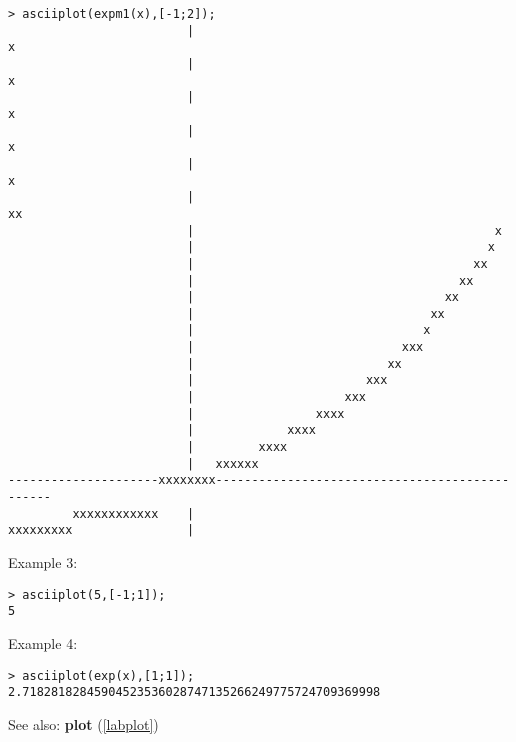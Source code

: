 \begin{center}\begin{minipage}{15cm}\begin{Verbatim}[frame=single]
> asciiplot(expm1(x),[-1;2]);
                         |                                                 x
                         |                                                x 
                         |                                               x  
                         |                                              x   
                         |                                             x    
                         |                                           xx     
                         |                                          x       
                         |                                         x        
                         |                                       xx         
                         |                                     xx           
                         |                                   xx             
                         |                                 xx               
                         |                                x                 
                         |                             xxx                  
                         |                           xx                     
                         |                        xxx                       
                         |                     xxx                          
                         |                 xxxx                             
                         |             xxxx                                 
                         |         xxxx                                     
                         |   xxxxxx                                         
---------------------xxxxxxxx-----------------------------------------------
         xxxxxxxxxxxx    |                                                  
xxxxxxxxx                |                                                  
\end{Verbatim}
\end{minipage}\end{center}
\noindent Example 3: 
\begin{center}\begin{minipage}{15cm}\begin{Verbatim}[frame=single]
> asciiplot(5,[-1;1]);
5
\end{Verbatim}
\end{minipage}\end{center}
\noindent Example 4: 
\begin{center}\begin{minipage}{15cm}\begin{Verbatim}[frame=single]
> asciiplot(exp(x),[1;1]);
2.71828182845904523536028747135266249775724709369998
\end{Verbatim}
\end{minipage}\end{center}
See also: \textbf{plot} (\ref{labplot})

